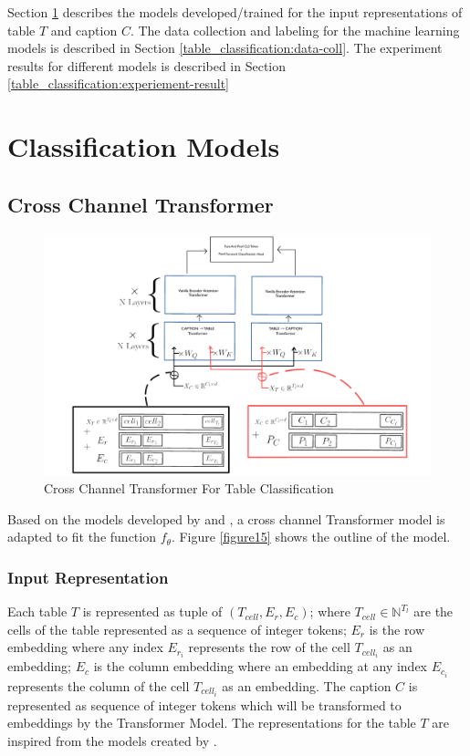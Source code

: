 Section \ref{table_classification:models} describes the models developed/trained for the input representations of table $T$ and caption $C$. The data collection and labeling for the machine learning models is described in Section \ref{table_classification:data-coll}. The experiment results for different models is described in Section \ref{table_classification:experiement-result}

\section{Classification Models}
\label{table_classification:models}

\subsection{Cross Channel Transformer}
\begin{figure}[h]
    \centering
    \includegraphics[width=\maxwidth{\textwidth}]{src/images/tablemodel.pdf}
    \caption{Cross Channel Transformer For Table Classification}
    \label{figure\arabic{figurecounter}}
\end{figure}

Based on the models developed by \cite{deng2020turl} and \cite{tsai2019multimodal}, a cross channel Transformer model is adapted to fit the function $f_\theta$. Figure \ref{figure15} shows the outline of the model.

\subsubsection{Input Representation}
Each table $T$ is represented as tuple of $(T_{cell},E_r,E_c)$; where $T_{cell} \in \mathbb{N}^{T_l}$ are the cells of the table represented as a sequence of integer tokens; $E_r$ is the row embedding where any index $E_{r_{i}}$ represents the row of the cell $T_{cell_{i}}$ as an embedding;  $E_c$ is the column embedding where an embedding at any index $E_{c_{i}}$ represents the column of the cell $T_{cell_{i}}$ as an embedding. The caption $C$ is represented as sequence of integer tokens which will be transformed to embeddings by the Transformer Model. The representations for the table $T$ are inspired from the models created by \cite{deng2020turl}. 


